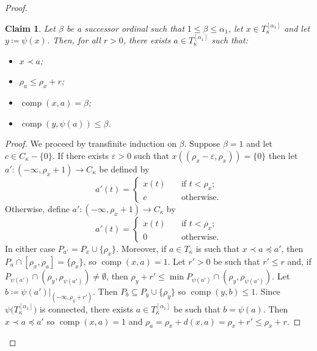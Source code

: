 \documentclass[11pt]{article}
\DeclareMathOperator{\comp}{comp}
\newtheorem{claim}{Claim}
\theoremstyle{definition}
\theoremstyle{remark}
\begin{document}
\begin{proof}
    \setcounter{claim}{0}
    \begin{claim}
     \label{claim: induction hyp}
    	Let $\beta$ be a successor ordinal such that $1 \leq \beta \leq \alpha_1$, let $x \in T_\kappa^{[\alpha_1]}$ and let $y \coloneqq \psi(x)$. Then, for all $r > 0$, there exists $a \in T_\kappa^{[\alpha_1]}$ such that:
    	\begin{itemize}
    		\item[i.] $x \prec a$;
    		\item[ii.] $\rho_a \leq \rho_x + r$;
    		\item[iii.] $\comp(x,a) = \beta$;
    		\item[iv.] $\comp(y, \psi(a)) \leq \beta$. 
    	\end{itemize}
    \end{claim}
    \begin{proof}
    	\renewcommand{\qedsymbol}{$\blacksquare$}
    	We proceed by transfinite induction on $\beta$. Suppose $\beta = 1$ and let $c \in C_\kappa - \{0\}$. If there exists $\varepsilon > 0$ such that $x((\rho_{x} - \varepsilon, \rho_{x})) = \{0\}$ then let $a': (-\infty, \rho_{x} + 1) \rightarrow C_\kappa$ be defined by 
    	\[
    	a'(t) =
    	\begin{cases}
    		x(t) \quad &\text{if } t < \rho_{x};\\
    		c &\text{otherwise.}
    	\end{cases}
    	\]
    	Otherwise, define $a': (-\infty, \rho_{x} + 1) \rightarrow C_\kappa$ by
    	\[ 
    	a'(t) =
    	\begin{cases}
    		x(t) \quad &\text{if } t < \rho_{x}; \\
    		0 &\text{otherwise.}
    	\end{cases}
    	\]
    	In either case $P_{a'} = P_{x} \cup \{\rho_{x}\}$. Moreover, if $a \in T_\kappa$ is such that $x \prec a \preceq a'$, then $P_{a} \cap [\rho_{x}, \rho_{a}] =\{\rho_{x}\}$, so $\comp(x, a) = 1$.
    	Let $r' > 0$ be such that $r' \leq r$ and, if $P_{\psi(a')} \cap (\rho_{y}, \rho_{\psi(a')}) \neq \emptyset$, then $\rho_{y} + r' \leq \min P_{\psi(a')} \cap (\rho_{y}, \rho_{\psi(a')})$.
    	Let $b \coloneqq \psi(a')|_{(-\infty, \rho_{y} + r')}$. Then $P_b \subseteq P_{y} \cup \{\rho_{y}\}$ so $\comp(y,b) \leq 1$.
    	Since $\psi\big(T_\kappa^{[\alpha_1]}\big)$ is connected, there exists $a \in T_\kappa^{[\alpha_1]}$ be such that $b = \psi(a)$. Then $x \prec a \preceq a'$ so $\comp(x, a) = 1$ and $\rho_{a} = \rho_{x} + d(x, a) = \rho_{x} + r' \leq \rho_{x} + r$.
    	

\end{proof}
\end{proof}
\end{document}
